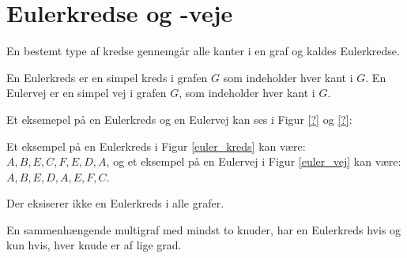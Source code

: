 \section{Eulerkredse og -veje}

En bestemt type af kredse gennemgår alle kanter i en graf og kaldes Eulerkredse. 

\begin{defn}\label{euler_def}
	En Eulerkreds er en simpel kreds i grafen $G$ som indeholder hver kant i $G$.
	En Eulervej er en simpel vej i grafen $G$, som indeholder hver kant i $G$.  
\end{defn}

\begin{exmp}
	Et eksemepel på en Eulerkreds og en Eulervej kan ses i Figur \ref{?} og \ref{?}: 
\end{exmp}





Et eksempel på en Eulerkreds i Figur \ref{euler_kreds} kan være: $A,B,E,C,F,E,D,A$, og
et eksempel på en Eulervej i Figur \ref{euler_vej} kan være: $A,B,E,D,A,E,F,C$.

Der eksiserer ikke en Eulerkreds i alle grafer.

\begin{thm}\label{Eulerkreds_multigraf}
	En sammenhængende multigraf med mindst to knuder, har en Eulerkreds hvis og kun hvis, hver knude er af lige grad.
\end{thm}

